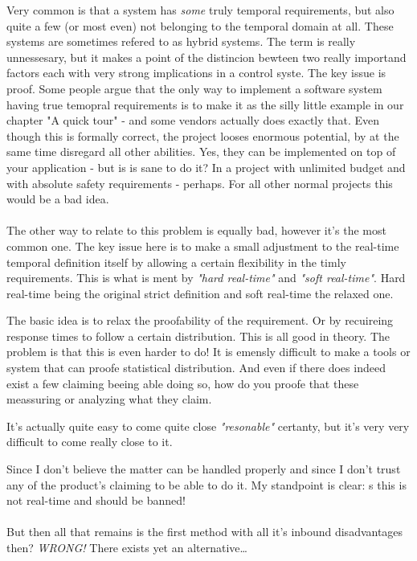 Very common is that a system has \textit{some} truly temporal requirements, but also quite a few (or most even) not belonging to the temporal domain at all. These systems are sometimes refered to as hybrid systems. The term is really unnessesary, but it makes a point of the distincion bewteen two really importand factors each with very strong implications in a control syste. 
The key issue is proof. Some people argue that the only way to implement a software system having true temopral requirements is to make it as the silly little example in our chapter "A quick tour" - and some vendors actually does exactly that. Even though this is formally correct, the project looses enormous potential, by at the same time disregard all other abilities. Yes, they can be implemented on top of your application - but is is sane to do it? In a project with unlimited budget and with absolute safety requirements - perhaps. For all other normal projects this would be a bad idea.
\\\\
The other way to relate to this problem is equally bad, however it's the most common one. The key issue here is to make a small adjustment to the real-time temporal definition itself by allowing a certain flexibility in the timly requirements. This is what is ment by \textit{"hard real-time"} and \textit{"soft real-time"}. Hard real-time being the original strict definition and soft real-time the relaxed one.

The basic idea is to relax the proofability of the requirement. Or by recuireing response times to follow a certain distribution. This is all good in theory. The problem is that this is even harder to do! It is emensly difficult to make a tools or system that can proofe statistical distribution. And even if there does indeed exist a few claiming beeing able doing so, how do you proofe that these meassuring or analyzing what they claim. 

It's actually quite easy to come quite close \textit{"resonable"} certanty, but it's very very difficult to come really close to it.

Since I don't believe the matter can be handled properly and since I don't trust any of the product's claiming to be able to do it. My standpoint is clear: s this is not real-time and should be banned!
\\\\
But then all that remains is the first method with all it's inbound disadvantages then? \textit{WRONG!} There exists yet an alternative\ldots

